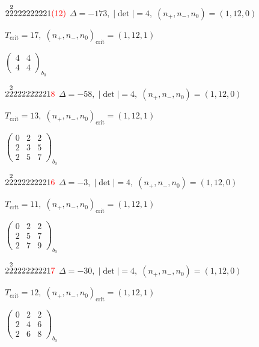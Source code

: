 \documentclass[10pt]{article}
\begin{document}
$2\overset{2}{2}222222221\textcolor{red}{(12)}$ \quad $\Delta=-173,\; |\det|=4,\; (n_+,n_-,n_0)=(1,12,0)$

\hspace{1em}$T_{\text{crit}}=17,\; (n_+,n_-,n_0)_{\text{crit}}=(1,12,1)$

\hspace{2em}$\left(\begin{smallmatrix}4 & 4 \\ 4 & 4\end{smallmatrix}\right)_{\!b_0}$

$2\overset{2}{2}222222221\textcolor{red}{8}$ \quad $\Delta=-58,\; |\det|=4,\; (n_+,n_-,n_0)=(1,12,0)$

\hspace{1em}$T_{\text{crit}}=13,\; (n_+,n_-,n_0)_{\text{crit}}=(1,12,1)$

\hspace{2em}$\left(\begin{smallmatrix}0 & 2 & 2 \\ 2 & 3 & 5 \\ 2 & 5 & 7\end{smallmatrix}\right)_{\!b_0}$

$2\overset{2}{2}222222221\textcolor{red}{6}$ \quad $\Delta=-3,\; |\det|=4,\; (n_+,n_-,n_0)=(1,12,0)$

\hspace{1em}$T_{\text{crit}}=11,\; (n_+,n_-,n_0)_{\text{crit}}=(1,12,1)$

\hspace{2em}$\left(\begin{smallmatrix}0 & 2 & 2 \\ 2 & 5 & 7 \\ 2 & 7 & 9\end{smallmatrix}\right)_{\!b_0}$

$2\overset{2}{2}222222221\textcolor{red}{7}$ \quad $\Delta=-30,\; |\det|=4,\; (n_+,n_-,n_0)=(1,12,0)$

\hspace{1em}$T_{\text{crit}}=12,\; (n_+,n_-,n_0)_{\text{crit}}=(1,12,1)$

\hspace{2em}$\left(\begin{smallmatrix}0 & 2 & 2 \\ 2 & 4 & 6 \\ 2 & 6 & 8\end{smallmatrix}\right)_{\!b_0}$

\smallskip
\end{document}
